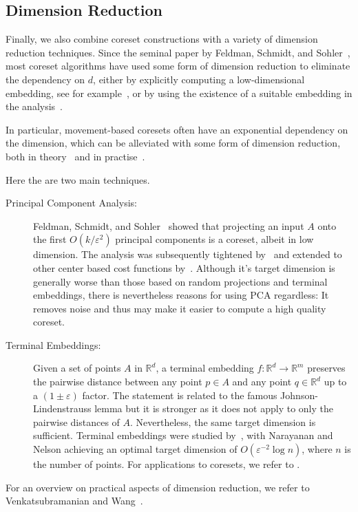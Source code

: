 \subsection{Dimension Reduction}

Finally, we also combine coreset constructions with a variety of dimension reduction techniques. Since the seminal paper by Feldman, Schmidt, and Sohler~\cite{FSS13}, most coreset algorithms have used some form of dimension reduction to eliminate the dependency on $d$, either by explicitly computing a low-dimensional embedding, see for example~\cite{FSS13,SoW18}, or by using the existence of a suitable embedding in the analysis~\cite{Cohen-AddadSS21,huang2020coresets}.

In particular, movement-based coresets often have an exponential dependency on the dimension, which can be alleviated with some form of dimension reduction, both in theory~\cite{SSS19} and in practise~\cite{KappmeierS015}.

Here the are two main techniques.

\begin{description}
\item[Principal Component Analysis:] Feldman, Schmidt, and Sohler~\cite{FSS13} showed that projecting an input $A$ onto the first $O(k/\varepsilon^2)$ principal components is a coreset, albeit in low dimension. The analysis was subsequently tightened by~\cite{CEMMP15} and extended to other center based cost functions by~\cite{SohlerW18}. Although it's target dimension is generally worse than those based on random projections and terminal embeddings, there is nevertheless reasons for using PCA regardless: It removes noise and thus may make it easier to compute a high quality coreset.
\item[Terminal Embeddings:] Given a set of points $A$ in $\mathbb{R}^d$, a terminal embedding $f:\mathbb{R}^d\rightarrow \mathbb{R}^m$ preserves the pairwise distance between any point $p\in A$ and any point $q\in \mathbb{R}^d$ up to a $(1\pm \varepsilon)$ factor. The statement is related to the famous Johnson-Lindenstrauss lemma but it is stronger as it does not apply to only the pairwise distances of $A$. Nevertheless, the same target dimension is sufficient. Terminal embeddings were studied by~\cite{ElkinFN17,MahabadiMMR18,NaN18}, with Narayanan and Nelson \cite{NaN18} achieving an optimal target dimension of $O(\varepsilon^{-2}\log n)$, where $n$ is the number of points. For applications to coresets, we refer to \cite{BecchettiBC0S19,Cohen-AddadSS21,huang2020coresets}.
\end{description}

For an overview on practical aspects of dimension reduction, we refer to Venkatsubramanian and Wang~\cite{VenkatasubramanianW11}.